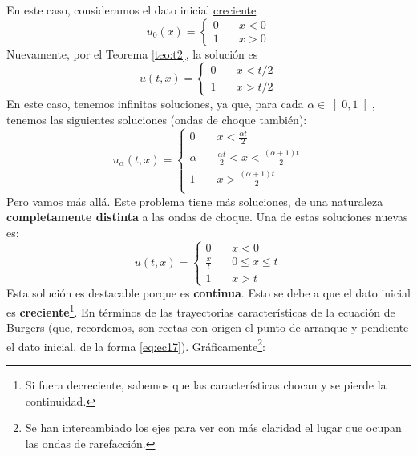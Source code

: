 \begin{ejemplo}
    En este caso, consideramos el dato inicial \underline{creciente}
    \begin{equation*}
        u_0(x) = \begin{cases}
            0 \quad& x < 0 \\
            1 \quad& x > 0
        \end{cases}
    \end{equation*}
    Nuevamente, por el Teorema \ref{teo:t2}, la solución es 
    \begin{equation*}
        u(t,x) = \begin{cases}
            0 \quad& x < t/2 \\
            1 \quad& x > t/2
        \end{cases}
    \end{equation*}
    En este caso, tenemos infinitas soluciones, ya que, para cada $\alpha \in \left]0, 1 \right[$, tenemos las siguientes soluciones (ondas de choque también):
    \begin{equation*}
        u_\alpha(t,x) = \begin{cases}
            0 \quad& x < \frac{\alpha t}{2} \\
            \alpha \quad& \frac{\alpha t}{2} < x < \frac{(\alpha+1) t}{2} \\
            1 \quad& x > \frac{(\alpha+1) t}{2} \\
        \end{cases}
    \end{equation*}
    Pero vamos más allá. Este problema tiene más soluciones, de una naturaleza \textbf{completamente distinta} a las ondas de choque. Una de estas
    soluciones nuevas es:
    \begin{equation}\label{eq:ec18}
        u(t,x) = \begin{cases}
            0 \quad& x < 0 \\
            \frac{x}{t} \quad& 0 \leq x \leq t \\
            1 \quad& x > t
        \end{cases}
    \end{equation}
    Esta solución es destacable porque es \textbf{continua}. Esto se debe a que el dato inicial es \textbf{creciente}\footnote{Si fuera
    decreciente, sabemos que las características chocan y se pierde la continuidad.}.
    En términos de las trayectorias características de la ecuación de Burgers (que, recordemos, son rectas con origen el punto de arranque 
    y pendiente el dato inicial, de la forma \eqref{eq:ec17}). Gráficamente\footnote{Se han intercambiado los ejes para ver con más claridad el lugar que ocupan las ondas de rarefacción.}:
    \begin{figure}[H]
        \begin{center}


\end{center}
\end{figure}
\end{ejemplo}
